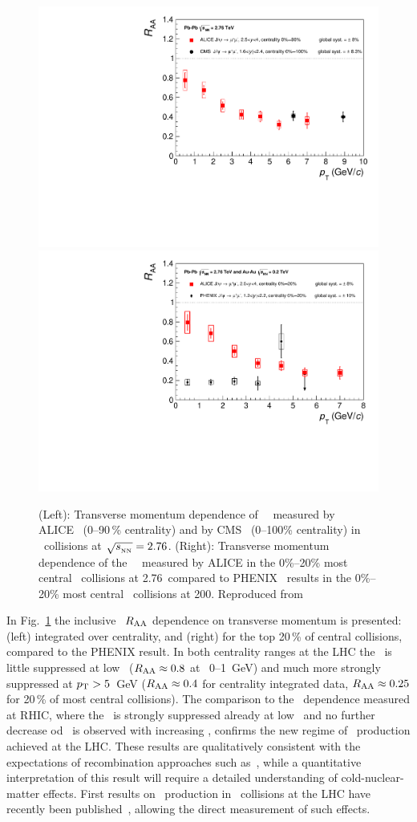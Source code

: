 \begin{figure}
\begin{center}
\includegraphics[width=0.49\linewidth,keepaspectratio]{quarkoniafigs/RAAPtvsModels1.pdf}
\includegraphics[width=0.49\linewidth,keepaspectratio]{quarkoniafigs/RAAPtvsModels2.pdf}
\caption{ \label{fig:KS:RaaPt}
(Left): Transverse momentum dependence of \Jpsi\ \Raa\ measured by ALICE~\cite{Abelev:2013ila} (0--90\,\% centrality) and by CMS~\cite{Chatrchyan:2012np} (0--100\% centrality) in \PbPb\
collisions at $\sqrt{s_{_{\rm NN}}} = 2.76$\TeV.
(Right): Transverse momentum dependence of the \Jpsi\ \Raa\ measured by ALICE in the 0\%--20\% most
central \PbPb\ collisions at 2.76\TeV\ compared to PHENIX~\cite{Adare:2011yf}
results in the 0\%--20\% most central \AuAu\ collisions at 200\GeV. Reproduced from~\cite{Abelev:2013ila}}
\end{center}
\end{figure}

In Fig.~\ref{fig:KS:RaaPt} the inclusive \Jpsi\ $R_{\rm AA}$ dependence on transverse momentum is presented: (left) integrated over centrality, and (right) for the top 20\,\% of central collisions, compared to the PHENIX result. In both centrality ranges at the LHC the \Jpsi\ is little suppressed at low \pt\ ($R_\mathrm{AA} \approx 0.8$ at \pt\ 0--1~GeV) and much more strongly suppressed at $\mbox{$p_{\mathrm{T}}$} > 5$~GeV ($R_\mathrm{AA} \approx 0.4$ for centrality integrated data, $R_\mathrm{AA} \approx 0.25$ for 20\,\% of most central collisions). The comparison to the \pt\ dependence measured at RHIC, where the \Jpsi\ is strongly suppressed already at low \pt\ and no further decrease od \Raa\ is observed with increasing \pt, confirms the new regime of \Jpsi\ production achieved at the LHC. These results are qualitatively consistent
with the expectations of recombination approaches such as~\cite{Zhao:2007hh,Zhou:2013aea,Liu:2009nb}, while a quantitative interpretation of this result will require
a detailed understanding of cold-nuclear-matter effects. First results on \Jpsi\ production in \pPb\ collisions at the LHC have recently been published~\cite{Abelev:2013yxa,Aaij:2013zxa}, allowing the direct measurement of such effects.

